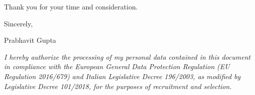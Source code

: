 \documentclass[11pt,a4paper]{article}
\begin{document}
Thank you for your time and consideration.

Sincerely,

\vspace{6pt}
Prabhavit Gupta

\vspace{20pt}
\textit{\small I hereby authorize the processing of my personal data contained in this document in compliance with the European General Data Protection Regulation (EU Regulation 2016/679) and Italian Legislative Decree 196/2003, as modified by Legislative Decree 101/2018, for the purposes of recruitment and selection.}
\end{document}
